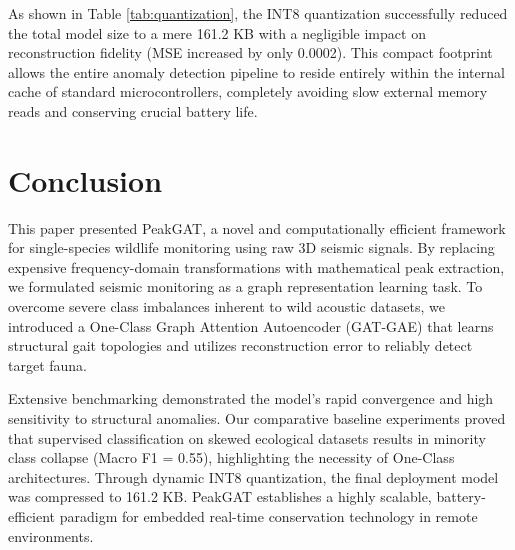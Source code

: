 \documentclass[conference, a4paper]{IEEEtran}
\begin{document}
As shown in Table \ref{tab:quantization}, the INT8 quantization successfully reduced the total model size to a mere 161.2 KB with a negligible impact on reconstruction fidelity (MSE increased by only 0.0002). This compact footprint allows the entire anomaly detection pipeline to reside entirely within the internal cache of standard microcontrollers, completely avoiding slow external memory reads and conserving crucial battery life.

\section{Conclusion}
This paper presented PeakGAT, a novel and computationally efficient framework for single-species wildlife monitoring using raw 3D seismic signals. By replacing expensive frequency-domain transformations with mathematical peak extraction, we formulated seismic monitoring as a graph representation learning task. To overcome severe class imbalances inherent to wild acoustic datasets, we introduced a One-Class Graph Attention Autoencoder (GAT-GAE) that learns structural gait topologies and utilizes reconstruction error to reliably detect target fauna. 

Extensive benchmarking demonstrated the model's rapid convergence and high sensitivity to structural anomalies. Our comparative baseline experiments proved that supervised classification on skewed ecological datasets results in minority class collapse (Macro F1 = 0.55), highlighting the necessity of One-Class architectures. Through dynamic INT8 quantization, the final deployment model was compressed to 161.2 KB. PeakGAT establishes a highly scalable, battery-efficient paradigm for embedded real-time conservation technology in remote environments.
\end{document}
